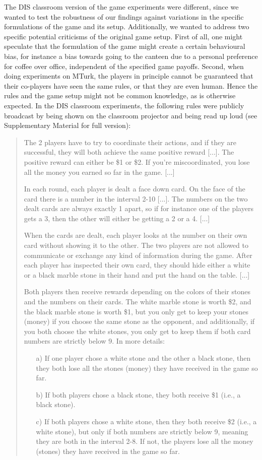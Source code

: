 \documentclass[twocolumn,a4paper,superscriptaddress,nofootinbib]{revtex4}
\begin{document}
The DIS classroom version of the game experiments were different, since we wanted to test the robustness of our findings against variations in the specific formulations of the game and its setup. Additionally, we wanted to address two specific potential criticisms of the original game setup. First of all, one might speculate that the formulation of the game might create a certain behavioural bias, for instance a bias towards going to the canteen due to a personal preference for coffee over office, 
  independent of the specified game payoffs. Second, when doing experiments on MTurk, the players  in principle cannot be guaranteed that their co-players have seen the same rules, or that they are even human. Hence the rules and the game setup might not be common knowledge, as is otherwise expected. In the DIS classroom experiments, the following rules were publicly broadcast by being shown on the classroom projector and being read up loud (see Supplementary Material for full version): 
\begin{quote}
\indent
The 2 players have to try to coordinate their actions, and if they are successful, they will both achieve the same positive reward [...]. The positive reward can either be \$1 or \$2. If you’re miscoordinated, you lose all the money you earned so far in the game. [...] 
  
In each round, each player is dealt a face down card. On the face of the card there is a number in the interval 2-10 [...]. The numbers on the two dealt cards are always exactly 1 apart, so if for instance one of the players gets a 3, then the other will either be getting a 2 or a 4. [...] 

When the cards are dealt, each player looks at the number on their own card without showing it to the other. The two players are not allowed to communicate or exchange any kind of information during the game. After each player has inspected their own card, they should hide either a white or a black marble stone in their hand and put the hand on the table. [...] 

Both players then receive rewards depending on the colors of their stones and the numbers on their cards. The white marble stone is worth \$2, and the black marble stone is worth \$1, but you only get to keep your stones (money) if you choose the same stone as the opponent, and additionally, if you both choose the white stones, you only get to keep them if both card numbers are strictly below 9. In more details:  
\begin{enumerate}
  \item[a)] If one player chose a white stone and the other a black stone, then they both lose all the stones (money) they have received in the game so far.    
  \item[b)] If both players chose a black stone, they both receive \$1 (i.e., a black stone). 
  \item[c)] If both players chose a white stone, then they both receive \$2 (i.e., a white stone), but only if both numbers are strictly below 9, meaning they are both in the interval 2-8. If not, the players lose all the money (stones) they have received in the game so far.
\end{enumerate}
\end{quote}
\end{document}
